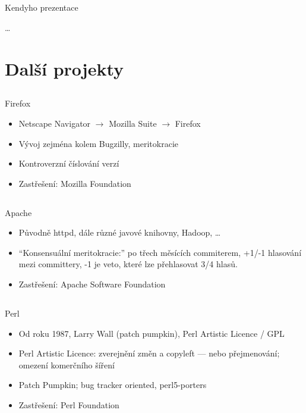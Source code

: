 \documentclass{beamer}
\begin{document}
\subsection{}
\begin{frame}{Kendyho prezentace}
\begin{center}
	\dots
\end{center}
\end{frame}


\section{Další projekty}

\subsection{}
\begin{frame}{Firefox}
\begin{itemize}
\item Netscape Navigator $\rightarrow$ Mozilla Suite $\rightarrow$ Firefox
\item Vývoj zejména kolem Bugzilly, meritokracie
\item Kontroverzní číslování verzí
\item Zastřešení: Mozilla Foundation
\end{itemize}
\end{frame}

\subsection{}
\begin{frame}{Apache}
\begin{itemize}
\item Původně httpd, dále různé javové knihovny, Hadoop, \dots
\item ``Konsensuální meritokracie:'' po třech měsících commiterem, +1/-1 hlasování mezi committery, -1 je veto, které lze přehlasovat 3/4 hlasů.
\item Zastřešení: Apache Software Foundation
\end{itemize}
\end{frame}

\subsection{}
\begin{frame}{Perl}
\begin{itemize}
\item Od roku 1987, Larry Wall (patch pumpkin), Perl Artistic Licence / GPL
\item Perl Artistic Licence: zverejnění změn a copyleft --- nebo přejmenování; omezení komerčního šíření
\item Patch Pumpkin; bug tracker oriented, perl5-porters
\item Zastřešení: Perl Foundation
\end{itemize}
\end{frame}
\end{document}
